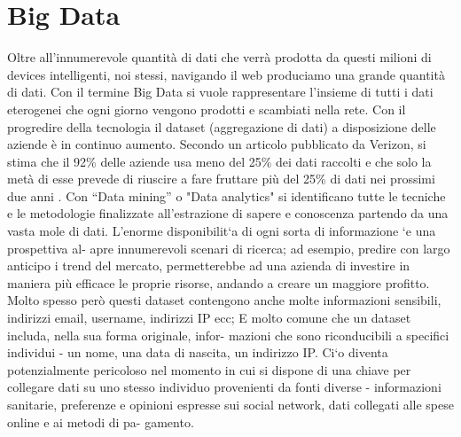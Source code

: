 \section{Big Data}
Oltre all'innumerevole quantità di dati che verrà prodotta da questi milioni di
devices intelligenti, noi stessi,  navigando il web produciamo una grande
quantità di dati. Con il  termine Big Data si vuole rappresentare l'insieme di
tutti i dati eterogenei che ogni giorno vengono prodotti e scambiati nella rete.
Con il progredire della tecnologia il dataset (aggregazione di dati) a
disposizione delle aziende è in continuo aumento.
Secondo un articolo pubblicato da Verizon, si stima che il 92\% delle aziende
usa meno del 25\% dei dati raccolti e che solo la metà  di esse prevede di
riuscire a fare fruttare più del 25\% di dati nei prossimi due anni
\cite{Verizon}.  Con “Data mining” o "Data analytics"  si identificano tutte le
tecniche e le metodologie finalizzate all’estrazione di sapere e conoscenza
partendo da una vasta mole di dati.
L’enorme disponibilit`a di ogni sorta di informazione `e una prospettiva al-
apre innumerevoli scenari di ricerca; ad esempio, predire con largo anticipo i 
trend del mercato, permetterebbe ad una azienda di investire in maniera più
efficace le proprie risorse, andando a creare un maggiore profitto.
Molto spesso però questi dataset contengono anche molte informazioni sensibili, 
indirizzi email, username, indirizzi IP ecc; 
E molto comune che un dataset includa, nella sua forma originale, infor-
mazioni che sono riconducibili a specifici individui - un nome, una data di
nascita, un indirizzo IP. Ci`o diventa potenzialmente pericoloso nel momento
in  cui  si  dispone  di  una  chiave  per  collegare  dati  su  uno  stesso  individuo
provenienti  da  fonti  diverse  -  informazioni  sanitarie,  preferenze  e  opinioni
espresse sui social network, dati collegati alle spese online e ai metodi di pa-
gamento.

